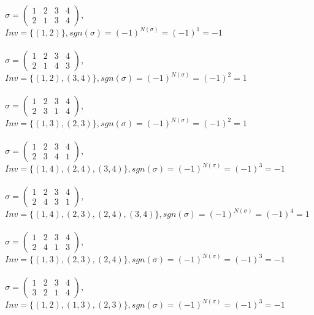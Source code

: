 \documentclass[12pt, a4paper]{article}
\begin{document}
\\
\noindent
$\sigma =\left(\begin{array}{cccc} 1 & 2 & 3 & 4\\ 2 & 1 & 3 & 4 \end{array}\right)$,\\  $Inv = \{(1,2)\}, sgn(\sigma) = (-1)^{N(\sigma)} = (-1)^1 = -1$\\
\\
\noindent
$\sigma =\left(\begin{array}{cccc} 1 & 2 & 3 & 4\\ 2 & 1 & 4 & 3 \end{array}\right)$,\\  $Inv = \{(1,2), (3,4)\}, sgn(\sigma) = (-1)^{N(\sigma)} = (-1)^2 = 1$\\
\\
\noindent
$\sigma =\left(\begin{array}{cccc} 1 & 2 & 3 & 4\\ 2 & 3 & 1 & 4 \end{array}\right)$,\\  $Inv = \{(1, 3), (2, 3)\}, sgn(\sigma) = (-1)^{N(\sigma)} = (-1)^2 = 1$\\
\\
\noindent
$\sigma =\left(\begin{array}{cccc} 1 & 2 & 3 & 4\\ 2 & 3 & 4 & 1 \end{array}\right)$,\\  $Inv = \{(1, 4), (2, 4), (3, 4)\}, sgn(\sigma) = (-1)^{N(\sigma)} = (-1)^3 = -1$\\
\\
\noindent
$\sigma =\left(\begin{array}{cccc} 1 & 2 & 3 & 4\\ 2 & 4 & 3 & 1 \end{array}\right)$,\\  $Inv = \{(1, 4), (2, 3), (2, 4), (3, 4)\}, sgn(\sigma) = (-1)^{N(\sigma)} = (-1)^4 = 1$\\
\\
\noindent
$\sigma =\left(\begin{array}{cccc} 1 & 2 & 3 & 4\\ 2 & 4 & 1 & 3 \end{array}\right)$,\\  $Inv = \{(1, 3), (2, 3), (2, 4)\}, sgn(\sigma) = (-1)^{N(\sigma)} = (-1)^3 = -1$\\
\\
\noindent
$\sigma =\left(\begin{array}{cccc} 1 & 2 & 3 & 4\\ 3 & 2 & 1 & 4 \end{array}\right)$,\\  $Inv = \{(1, 2), (1, 3), (2, 3)\}, sgn(\sigma) = (-1)^{N(\sigma)} = (-1)^3 = -1$\\
\end{document}
